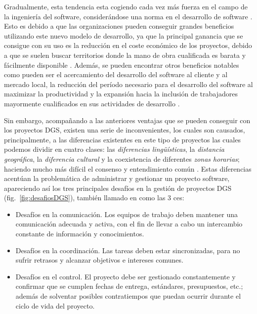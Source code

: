 Gradualmente, esta tendencia esta cogiendo cada vez más fuerza en el campo de la ingeniería del software, considerándose una norma en el desarrollo de software \cite{bosnic2019assessing}. Esto es debido a que las organizaciones pueden conseguir grandes beneficios utilizando este nuevo modelo de desarrollo, ya que la principal ganancia que se consigue con su uso es la reducción en el coste económico de los proyectos, debido a que se suelen buscar territorios donde la mano de obra cualificada es barata y fácilmente disponible \cite{monasor2010preparing}. Además, se pueden encontrar otros beneficios notables como pueden ser el acercamiento del desarrollo del software al cliente y al mercado local, la reducción del período necesario para el desarrollo del software al maximizar la productividad y la expansión hacia la inclusión de trabajadores mayormente cualificados en sus actividades de desarrollo \cite{aagerfalk2008benefits}.

Sin embargo, acompañando a las anteriores ventajas que se pueden conseguir con los proyectos DGS, existen una serie de inconvenientes, los cuales son causados, principalmente, a las diferencias existentes en este tipo de proyectos las cuales podemos dividir en cuatro clases: las \emph{diferencias lingüísticas}, la \emph{distancia geográfica}, la \emph{diferencia cultural} y la coexistencia de diferentes \emph{zonas horarias}; haciendo mucho más difícil el consenso y entendimiento común \cite{monasor2010preparing}. Estas diferencias acentúan la problemática de administrar y gestionar un proyecto software, apareciendo así los tres principales desafíos en la gestión de proyectos DGS (fig.~\ref{fig:desafiosDGS}), también llamado en \cite{piattini2014desarrollo} como las 3 ces:
\begin{itemize}
	\item Desafíos en la comunicación. Los equipos de trabajo deben mantener una comunicación adecuada y activa, con el fin de llevar a cabo un intercambio constante de información y conocimientos. 
	\item Desafíos en la coordinación. Las tareas deben estar sincronizadas, para no sufrir retrasos y alcanzar objetivos e intereses comunes. 
	\item Desafíos en el control. El proyecto debe ser gestionado constantemente y confirmar que se cumplen fechas de entrega, estándares, presupuestos, etc.; además de solventar posibles contratiempos que puedan ocurrir durante el ciclo de vida del proyecto. 
\end{itemize}


